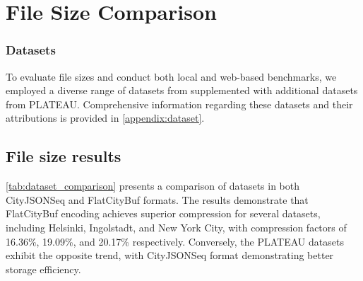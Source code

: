 \section{File Size Comparison}
\label{result:file_size_comparison}

\subsubsection{Datasets}
\label{result:overview:dataset}
To evaluate file sizes and conduct both local and web-based benchmarks, we employed a diverse range of datasets from \citet{ledoux_2024} supplemented with additional datasets from PLATEAU. Comprehensive information regarding these datasets and their attributions is provided in \autoref{appendix:dataset}.

\subsection{File size results}
\label{result:overview:filesize_comparison}

\autoref{tab:dataset_comparison} presents a comparison of datasets in both CityJSONSeq and FlatCityBuf formats. The results demonstrate that FlatCityBuf encoding achieves superior compression for several datasets, including Helsinki, Ingolstadt, and New York City, with compression factors of 16.36\%, 19.09\%, and 20.17\% respectively. Conversely, the PLATEAU datasets exhibit the opposite trend, with CityJSONSeq format demonstrating better storage efficiency.

